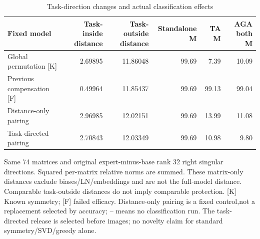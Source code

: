 \begin{table}[!htbp]
\centering
\small
\caption{Task-direction changes and actual classification effects}
\label{tab:geometry}
\begin{tabular}{lrrrrr}
\toprule
Fixed model & Task-inside distance & Task-outside distance & Standalone M & TA M & AGA both M \\
\midrule
Global permutation [K] & 2.69895 & 11.86048 & 99.69 & 7.39 & 10.09 \\
Previous compensation [F] & 0.49964 & 11.85437 & 99.69 & 99.13 & 99.04 \\
Distance-only pairing & 2.96985 & 12.02151 & 99.69 & 13.99 & 11.08 \\
Task-directed pairing & 2.70843 & 12.03349 & 99.69 & 10.98 & 9.80 \\
\bottomrule
\end{tabular}
\par\vspace{3pt}\begin{minipage}{0.98\linewidth}\footnotesize Same 74 matrices and original expert-minus-base rank 32 right singular directions. Squared per-matrix relative norms are summed. These matrix-only distances exclude biases/LN/embeddings and are not the full-model distance. Comparable task-outside distances do not imply comparable protection. [K] Known symmetry; [F] failed efficacy. Distance-only pairing is a fixed control,not a replacement selected by accuracy; -- means no classification run. The task-directed release is selected before images; no novelty claim for standard symmetry/SVD/greedy alone.\end{minipage}
\end{table}

